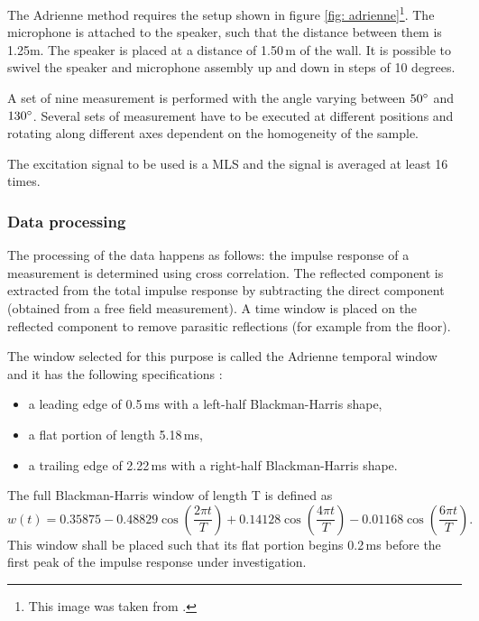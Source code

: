 The Adrienne method requires the setup shown in figure \ref{fig: adrienne}\footnote{This image was taken from \cite[p.45]{Geetere}.}. The microphone is attached to the speaker, such that the distance between them is 1.25m. The speaker is placed at a distance of 1.50\,m of the wall. It is possible to swivel the speaker and microphone assembly up and down in steps of 10 degrees.

A set of nine measurement is performed with the angle varying between $50^{\circ}$ and $130^{\circ}$. Several sets of measurement have to be executed at different positions and rotating along different axes dependent on the homogeneity of the sample.

The excitation signal to be used is a MLS and the signal is averaged at least 16 times.


\subsubsection{Data processing}\label{adrwindow}
The processing of the data happens as follows: the impulse response of a measurement is determined using cross correlation. The reflected component is extracted from the total impulse response by subtracting the direct component (obtained from a free field measurement). A time window is placed on the reflected component to remove parasitic reflections (for example from the floor).

The window selected for this purpose is called the Adrienne temporal window and it has the following specifications \cite{Adrienne}:
\begin{itemize}
	\setlength{\itemsep}{1pt}
  \setlength{\parskip}{0pt}
  \setlength{\parsep}{0pt}
	\item a leading edge of 0.5\,ms with a left-half Blackman-Harris shape,
	\item a flat portion of length 5.18\,ms,
	\item a trailing edge of 2.22\,ms with a right-half Blackman-Harris shape.
\end{itemize}
The full Blackman-Harris window of length T is defined as 
\[
w(t) = 0.35875 - 0.48829 \cos\left(\frac{2 \pi t}{T}\right) + 0.14128 \cos\left(\frac{4 \pi t}{T}\right) - 0.01168 \cos\left(\frac{6 \pi t}{T}\right).
\]
This window shall be placed such that its flat portion begins 0.2\,ms before the first peak of the impulse response under investigation.


